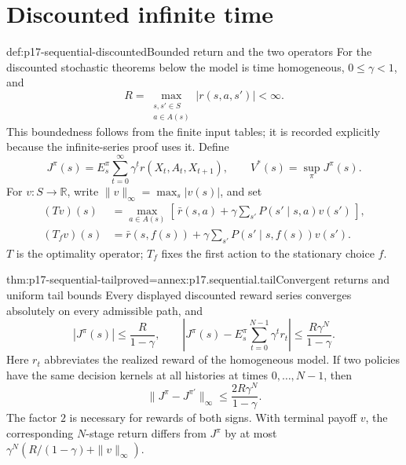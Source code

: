 \section{Discounted infinite time}

\begin{hbdefinition}{def:p17-sequential-discounted}{Bounded return and the two operators}
For the discounted stochastic theorems below the model is time homogeneous,
\(0\leq\gamma<1\), and
\[
 R=\max_{\substack{s,s'\in S\\a\in A(s)}}|r(s,a,s')|<\infty .
\]
This boundedness follows from the finite input tables; it is
recorded explicitly because the infinite-series proof uses it.
Define
\[
 J^\pi(s)=E_s^\pi\sum_{t=0}^{\infty}
                      \gamma^t r(X_t,A_t,X_{t+1}),\qquad
 V^*(s)=\sup_\pi J^\pi(s).
\]
For \(v:S\to\mathbb R\), write
\(\|v\|_\infty=\max_s|v(s)|\), and set
\[
\begin{aligned}
 (Tv)(s)&=\max_{a\in A(s)}
                  [\,\bar r(s,a)+\gamma\sum_{s'}P(s'\mid s,a)v(s')\,],\\
 (T_fv)(s)&=\bar r(s,f(s))
                         +\gamma\sum_{s'}P(s'\mid s,f(s))v(s').
\end{aligned}
\]
\(T\) is the optimality operator; \(T_f\) fixes the first action
to the stationary choice \(f\).
\end{hbdefinition}

\begin{hbtheorem}{thm:p17-sequential-tail}{proved=annex:p17.sequential.tail}{Convergent returns and uniform tail bounds}
Every displayed discounted reward series converges absolutely
on every admissible path, and
\[
 |J^\pi(s)|\leq\frac R{1-\gamma},\qquad
 \left|J^\pi(s)-E_s^\pi\sum_{t=0}^{N-1}\gamma^t r_t\right|
                       \leq\frac{R\gamma^N}{1-\gamma}.
\]
Here \(r_t\) abbreviates the realized reward of the homogeneous
model. If two policies have the same decision kernels at all
histories at times \(0,\ldots,N-1\), then
\[
                  \|J^\pi-J^{\pi'}\|_\infty
                          \leq\frac{2R\gamma^N}{1-\gamma}.
\]
The factor \(2\) is necessary for rewards of both signs.
With terminal payoff \(v\), the corresponding \(N\)-stage
return differs from \(J^\pi\) by at most
\(\gamma^N(R/(1-\gamma)+\|v\|_\infty)\).
\end{hbtheorem}

